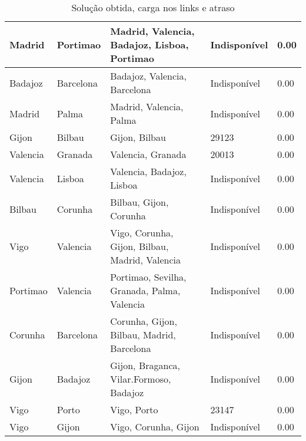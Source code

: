\begin{table}[!htb]
{\begin{tabular}{|l|l|l|l|l|}
Madrid & Portimao & Madrid, Valencia, Badajoz, Lisboa, Portimao & Indisponível & 0.00 \\ \hline
Badajoz & Barcelona & Badajoz, Valencia, Barcelona & Indisponível & 0.00 \\ \hline
Madrid & Palma & Madrid, Valencia, Palma & Indisponível & 0.00 \\ \hline
Gijon & Bilbau & Gijon, Bilbau & 29123 & 0.00 \\ \hline
Valencia & Granada & Valencia, Granada & 20013 & 0.00 \\ \hline
Valencia & Lisboa & Valencia, Badajoz, Lisboa & Indisponível & 0.00 \\ \hline
Bilbau & Corunha & Bilbau, Gijon, Corunha & Indisponível & 0.00 \\ \hline
Vigo & Valencia & Vigo, Corunha, Gijon, Bilbau, Madrid, Valencia & Indisponível & 0.00 \\ \hline
Portimao & Valencia & Portimao, Sevilha, Granada, Palma, Valencia & Indisponível & 0.00 \\ \hline
Corunha & Barcelona & Corunha, Gijon, Bilbau, Madrid, Barcelona & Indisponível & 0.00 \\ \hline
Gijon & Badajoz & Gijon, Braganca, Vilar.Formoso, Badajoz & Indisponível & 0.00 \\ \hline
Vigo & Porto & Vigo, Porto & 23147 & 0.00 \\ \hline
Vigo & Gijon & Vigo, Corunha, Gijon & Indisponível & 0.00 \\ \hline
\end{tabular}}
\caption[]{Solução obtida, carga nos links e atraso}
\end{table}

